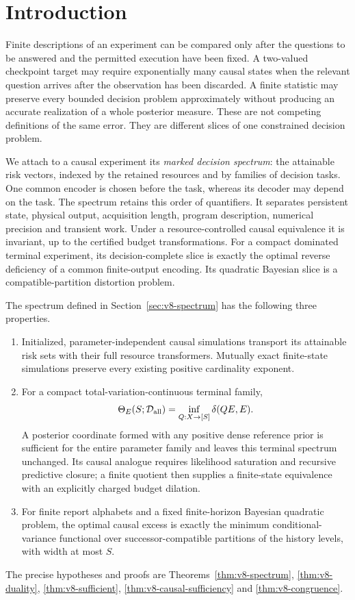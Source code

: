 \section{Introduction}
Finite descriptions of an experiment can be compared only after the
questions to be answered and the permitted execution have been fixed.
A two-valued checkpoint target may require exponentially many causal
states when the relevant question arrives after the observation has been
discarded. A finite statistic may preserve every bounded decision problem
approximately without producing an accurate realization of a whole
posterior measure. These are not competing definitions of the same
error. They are different slices of one constrained decision problem.

We attach to a causal experiment its \emph{marked decision spectrum}:
the attainable risk vectors, indexed by the retained resources and by
families of decision tasks. One common encoder is chosen before the
task, whereas its decoder may depend on the task. The spectrum retains
this order of quantifiers. It separates persistent state, physical output,
acquisition length, program description, numerical precision and transient
work. Under a resource-controlled causal equivalence it is invariant,
up to the certified budget transformations. For a compact dominated
terminal experiment, its decision-complete slice is exactly the optimal
reverse deficiency of a common finite-output encoding. Its quadratic
Bayesian slice is a compatible-partition distortion problem.

\begin{theorem}
\label{thm:v8-main}
The spectrum defined in Section~\ref{sec:v8-spectrum} has the following
three properties.
\begin{enumerate}
\item Initialized, parameter-independent causal simulations transport
its attainable risk sets with their full resource transformers. Mutually
exact finite-state simulations preserve every existing positive
cardinality exponent.
\item For a compact total-variation-continuous terminal family,
\[
 \Theta_E(S;\mathcal D_{\rm all})
          =\inf_{Q:X\to[S]}\delta(QE,E).
\]
A posterior coordinate formed with any positive dense reference prior
is sufficient for the entire parameter family and leaves this terminal
spectrum unchanged. Its causal analogue requires likelihood saturation
and recursive predictive closure; a finite quotient then supplies a
finite-state equivalence with an explicitly charged budget dilation.
\item For finite report alphabets and a fixed finite-horizon Bayesian
quadratic problem, the optimal causal excess is exactly the minimum
conditional-variance functional over successor-compatible partitions
of the history levels, with width at most $S$.
\end{enumerate}
The precise hypotheses and proofs are Theorems~\ref{thm:v8-spectrum},
\ref{thm:v8-duality}, \ref{thm:v8-sufficient},
\ref{thm:v8-causal-sufficiency} and \ref{thm:v8-congruence}.
\end{theorem}

